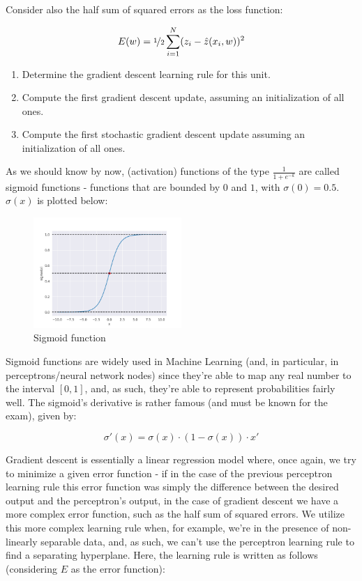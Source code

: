 \documentclass[12pt]{article}
\begin{document}
\begin{enumerate}[leftmargin=\labelsep]
\begin{tcolorbox}[enhanced jigsaw,colback=bg,boxrule=0pt,arc=1pt,halign=center]
    Consider also the half sum of squared errors as the loss function:

    \begin{equation*}
      E(w) = \nicefrac{1}{2} \sum_{i=1}^N (z_i - \hat{z}(x_i, w))^2
    \end{equation*}

    \begin{enumerate}
      \item Determine the gradient descent learning rule for this unit.
      \item Compute the first gradient descent update, assuming an initialization of all ones.
      \item Compute the first stochastic gradient descent update assuming an initialization of all ones.
    \end{enumerate}
  \end{tcolorbox}

  As we should know by now, (activation) functions of the type $\frac{1}{1 + e^{-k}}$
  are called sigmoid functions - functions that are bounded by $0$ and $1$,
  with $\sigma(0) = 0.5$. $\sigma(x)$ is plotted below:

  \begin{figure}[h]
    \centering
    \includegraphics[width=0.5\textwidth]{assets/sigmoid.png}
    \caption{Sigmoid function}
  \end{figure}
  
  Sigmoid functions are widely used in Machine Learning (and, in particular, in
  perceptrons/neural network nodes) since they're able to map any real number
  to the interval $[0, 1]$, and, as such, they're able to represent probabilities
  fairly well. The sigmoid's derivative is rather famous (and must be known
  for the exam), given by:

  $$
    \sigma'(x) = \sigma(x) \cdot (1 - \sigma(x)) \cdot x'
  $$

  Gradient descent is essentially a linear regression
  model where, once again, we try to minimize a given error function - if in the case
  of the previous perceptron learning rule this error function was simply the
  difference between the desired output and the perceptron's output, in the case
  of gradient descent we have a more complex error function, such as the half
  sum of squared errors. We utilize this more complex learning rule when, for example,
  we're in the presence of non-linearly separable data, and, as such, we can't
  use the perceptron learning rule to find a separating hyperplane. Here, the
  learning rule is written as follows (considering $E$ as the error function):


\end{enumerate}
\end{document}
